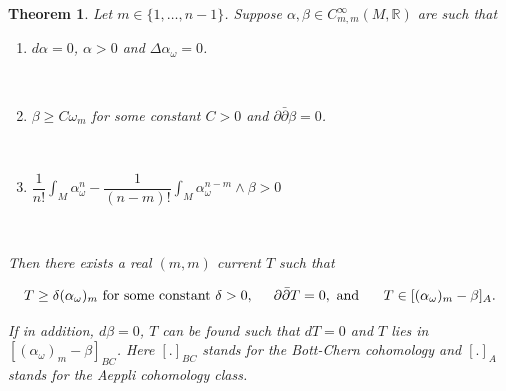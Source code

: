 \documentclass[11pt,letterpaper]{amsart}
\newcommand{\pbp}{\partial \bar{\partial}}
\newtheorem{theorem}{Theorem}[section]
\numberwithin{equation}{section}
\begin{document}
\begin{theorem}\label{demailly-thm}
    Let $m \in \{1, \hdots, n-1\}$. Suppose $\alpha, \beta \in C^{\infty}_{m,m}(M, \mathbb R)$ are such that

    \begin{enumerate}
        \item $d\alpha =0 $, $\alpha >0$ and $\Delta \alpha_{\omega} =0$.

        \ 

        \item $\beta \geq C \omega_m$ for some constant $C>0$ and $\pbp \beta =0$.

        \ 

        \item $\dfrac{1}{n!}\int_M \alpha_{\omega}^n - \dfrac{1}{(n-m)!}\int_M\alpha_{\omega}^{n-m}\wedge \beta >0$
    \end{enumerate}

    \

    Then there exists a real $(m,m)$ current $T$ such that 

    $$T \geq \delta (\alpha_{\omega})_m \text{ for some constant } \delta >0,\hspace{0.5cm} \pbp T = 0, \text{ and } \hspace{0.5cm} T \in [(\alpha_{\omega})_m - \beta]_A.$$

    If in addition, $d \beta = 0$, $T$ can be found such that $dT = 0$ and $T$ lies in $[(\alpha_{\omega})_m - \beta]_{BC}$. Here $[.]_{BC}$ stands for the Bott-Chern cohomology and $[.]_A$ stands for the Aeppli cohomology class.
\end{theorem}
\end{document}

